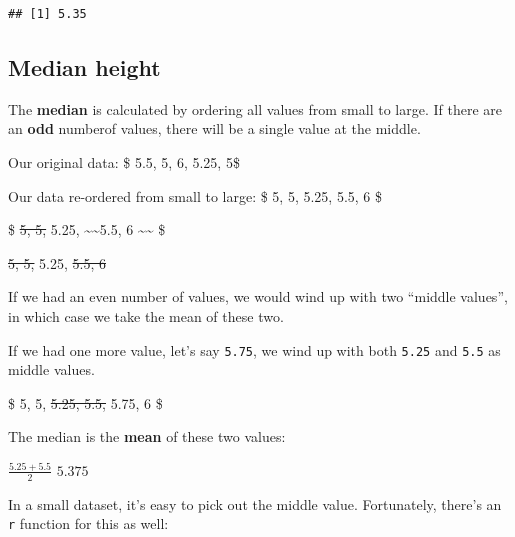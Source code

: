 \documentclass[
]{book}
\newenvironment{Shaded}{\begin{snugshade}}{\end{snugshade}}
\newcommand{\DocumentationTok}[1]{\textcolor[rgb]{0.56,0.35,0.01}{\textbf{\textit{#1}}}}
\newcommand{\FunctionTok}[1]{\textcolor[rgb]{0.13,0.29,0.53}{\textbf{#1}}}
\newcommand{\NormalTok}[1]{#1}
\newcommand{\SpecialCharTok}[1]{\textcolor[rgb]{0.81,0.36,0.00}{\textbf{#1}}}
\begin{document}
\begin{Shaded}
\end{Shaded}

\begin{verbatim}
## [1] 5.35
\end{verbatim}

\hypertarget{median-height}{%
\subsection{Median height}\label{median-height}}

The \textbf{median} is calculated by ordering all values from small to large. If there are an \textbf{odd} numberof values, there will be a single value at the middle.

Our original data:
\$ 5.5, 5, 6, 5.25, 5\$

Our data re-ordered from small to large:
\$ 5, 5, 5.25, 5.5, 6 \$

\$ \st{5, 5,} 5.25, \textasciitilde\textasciitilde5.5, 6 \textasciitilde\textasciitilde{} \$

\st{5, 5,} 5.25, \st{5.5, 6}

If we had an even number of values, we would wind up with two ``middle values'', in which case we take the mean of these two.

If we had one more value, let's say \texttt{5.75}, we wind up with both \texttt{5.25} and \texttt{5.5} as middle values.

\$ 5, 5, \st{5.25, 5.5,} 5.75, 6 \$

The median is the \textbf{mean} of these two values:

\(\frac{5.25+5.5}{2}\)
\(5.375\)

In a small dataset, it's easy to pick out the middle value. Fortunately, there's an \texttt{r} function for this as well:

\begin{Shaded}
\end{Shaded}
\end{document}
